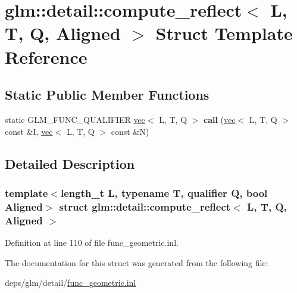 \hypertarget{structglm_1_1detail_1_1compute__reflect}{}\section{glm\+:\+:detail\+:\+:compute\+\_\+reflect$<$ L, T, Q, Aligned $>$ Struct Template Reference}
\label{structglm_1_1detail_1_1compute__reflect}
\subsection*{Static Public Member Functions}
\begin{DoxyCompactItemize}
\item 
\mbox{\label{structglm_1_1detail_1_1compute__reflect_a2f96de0f0e05a3587f4430941e71cd31}} 
static G\+L\+M\+\_\+\+F\+U\+N\+C\+\_\+\+Q\+U\+A\+L\+I\+F\+I\+ER \hyperlink{structglm_1_1vec}{vec}$<$ L, T, Q $>$ {\bfseries call} (\hyperlink{structglm_1_1vec}{vec}$<$ L, T, Q $>$ const \&I, \hyperlink{structglm_1_1vec}{vec}$<$ L, T, Q $>$ const \&N)
\end{DoxyCompactItemize}


\subsection{Detailed Description}
\subsubsection*{template$<$length\+\_\+t L, typename T, qualifier Q, bool Aligned$>$\newline
struct glm\+::detail\+::compute\+\_\+reflect$<$ L, T, Q, Aligned $>$}



Definition at line 110 of file func\+\_\+geometric.\+inl.



The documentation for this struct was generated from the following file\+:\begin{DoxyCompactItemize}
\item 
deps/glm/detail/\hyperlink{func__geometric_8inl}{func\+\_\+geometric.\+inl}\end{DoxyCompactItemize}
